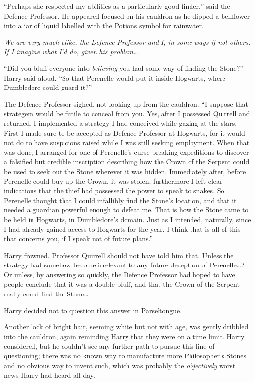 “Perhaps she respected my abilities as a particularly good finder,” said the
Defence Professor. He appeared focused on his cauldron as he dipped a
bellflower into a jar of liquid labelled with the Potions symbol for rainwater.

\emph{We are very much alike, the Defence Professor and I, in some ways if not
others. If I imagine what I’d do, given his problem…}

“Did you bluff everyone into \emph{believing} you had some way of finding the
Stone?” Harry said aloud. “So that Perenelle would put it inside Hogwarts,
where Dumbledore could guard it?”

The Defence Professor sighed, not looking up from the cauldron. “I suppose that
strategem would be futile to conceal from you. Yes, after I possessed Quirrell
and returned, I implemented a strategy I had conceived while gazing at the
stars. First I made sure to be accepted as Defence Professor at Hogwarts, for
it would not do to have suspicions raised while I was still seeking employment.
When that was done, I arranged for one of Perenelle’s curse-breaking
expeditions to discover a falsified but credible inscription describing how the
Crown of the Serpent could be used to seek out the Stone wherever it was
hidden. Immediately after, before Perenelle could buy up the Crown, it was
stolen; furthermore I left clear indications that the thief had possessed the
power to speak to snakes. So Perenelle thought that I could infallibly find the
Stone’s location, and that it needed a guardian powerful enough to defeat me.
That is how the Stone came to be held in Hogwarts, in Dumbledore’s domain. Just
as I intended, naturally, since I had already gained access to Hogwarts for the
year. I think that is all of this that concerns you, if I speak not of future
plans.”

Harry frowned. Professor Quirrell should not have told him that. Unless the
strategy had somehow become irrelevant to any future deception of
Perenelle…? Or unless, by answering so quickly, the Defence Professor
had hoped to have people conclude that it was a double-bluff, and that the
Crown of the Serpent really could find the Stone…

Harry decided not to question this answer in Parseltongue.

Another lock of bright hair, seeming white but not with age, was gently
dribbled into the cauldron, again reminding Harry that they were on a time
limit. Harry considered, but he couldn’t see any further path to pursue this
line of questioning; there was no known way to manufacture more Philosopher’s
Stones and no obvious way to invent such, which was probably the
\emph{objectively} worst news Harry had heard all day.

